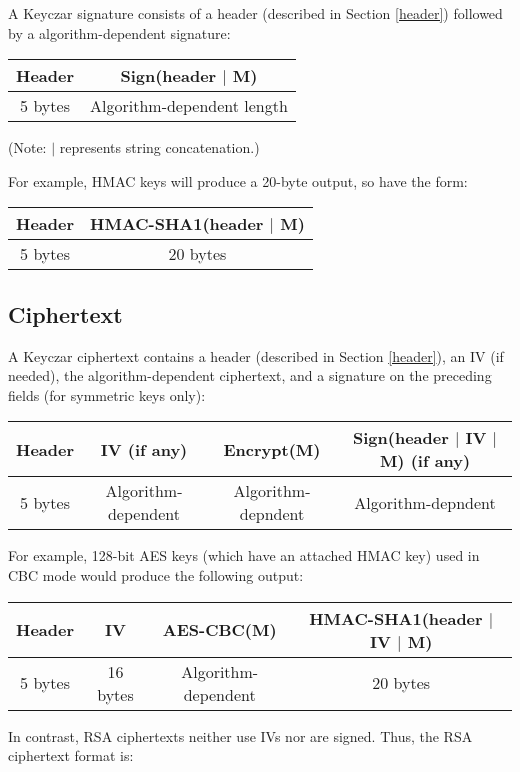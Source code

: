 \documentclass{llncs}
\begin{document}
A Keyczar signature consists of a header (described in Section \ref{header})
followed by a algorithm-dependent signature:

\begin{tabular}{| c | c |}
\hline
Header & Sign(header $|$ M) \\
\hline 5 bytes & Algorithm-dependent length \\ \hline
\end{tabular}

(Note: $|$ represents string concatenation.)

For example, HMAC keys will produce a 20-byte output, so have the form:

\begin{tabular}{| c | c |}
\hline
Header & HMAC-SHA1(header $|$ M) \\ \hline
5 bytes & 20 bytes \\ \hline
\end{tabular}

\subsection{Ciphertext}

A Keyczar ciphertext contains a header (described in Section \ref{header}), an
IV (if needed), the algorithm-dependent ciphertext, and a signature on the
preceding fields (for symmetric keys only):

\begin{tabular}{| c | c | c | c |}
\hline
Header & IV (if any) & Encrypt(M) & Sign(header $|$ IV $|$ M) (if any) \\ \hline
5 bytes & Algorithm-dependent & Algorithm-depndent & Algorithm-depndent \\
\hline
\end{tabular}

\vspace{1mm}

For example, 128-bit AES keys (which have an attached HMAC key) used in CBC
mode would produce the following output:

\begin{tabular}{| c | c | c | c |}
\hline
Header & IV & AES-CBC(M) & HMAC-SHA1(header $|$ IV $|$ M) \\ \hline
5 bytes & 16 bytes & Algorithm-dependent & 20 bytes \\
\hline
\end{tabular}

In contrast, RSA ciphertexts neither use IVs nor are signed. Thus, the RSA
ciphertext format is:
\end{document}
